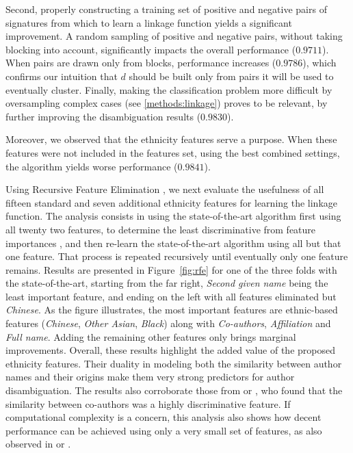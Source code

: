 \documentclass[runningheads,a4paper]{llncs}
\newcommand{\longpage}{\enlargethispage{1.5\baselineskip}}
\begin{document}
\longpage

Second, properly constructing a training set of positive and negative pairs of
signatures from which to learn a linkage function yields a significant
improvement.
A random sampling of positive and negative pairs, without taking
blocking into account, significantly impacts the overall performance
($0.9711$). When pairs are drawn only from blocks, performance increases
($0.9786$), which confirms our intuition that $d$ should be built only from
pairs it will be used to eventually cluster. Finally, making the classification
problem more difficult by oversampling complex cases (see \ref{methods:linkage}) proves to be relevant,
by further improving the disambiguation results ($0.9830$).

Moreover, we observed that the ethnicity features serve a purpose. When these features were not
included in the features set, using the best combined settings, the algorithm yields worse performance
($0.9841$).

Using Recursive Feature Elimination \cite{guyon2002gene}, we next evaluate the
usefulness of all fifteen standard and seven additional ethnicity features for learning
the linkage function. The analysis consists in using the state-of-the-art algorithm
first using all twenty two features, to determine the least discriminative from feature
importances \cite{louppe2013understanding}, and then re-learn the state-of-the-art algorithm
using all but that one feature. That process is repeated recursively until
eventually only one feature remains. Results are presented in
Figure~\ref{fig:rfe} for one of the three folds with
the state-of-the-art, starting from the far right, \textit{Second given name} being the least important feature,
and ending on the left with all features eliminated but \textit{Chinese}. As
the figure illustrates, the most important features are ethnic-based features
(\textit{Chinese}, \textit{Other Asian}, \textit{Black}) along with
\textit{Co-authors}, \textit{Affiliation} and \textit{Full name}. Adding the remaining
other features only brings marginal improvements.
Overall, these results highlight the added value of the proposed ethnicity
features.
Their duality in modeling both the similarity between author names
and their origins make them very strong predictors for author disambiguation.
The results also corroborate those from \cite{kang2009co} or \cite{ferreira2010effective}, who
found that the similarity between co-authors was a highly discriminative
feature.
If computational complexity is a concern, this analysis also
shows how decent performance can be achieved using only a very
small set of features, as also observed in
\cite{treeratpituk2009disambiguating} or \cite{levin2012citation}.
\end{document}
